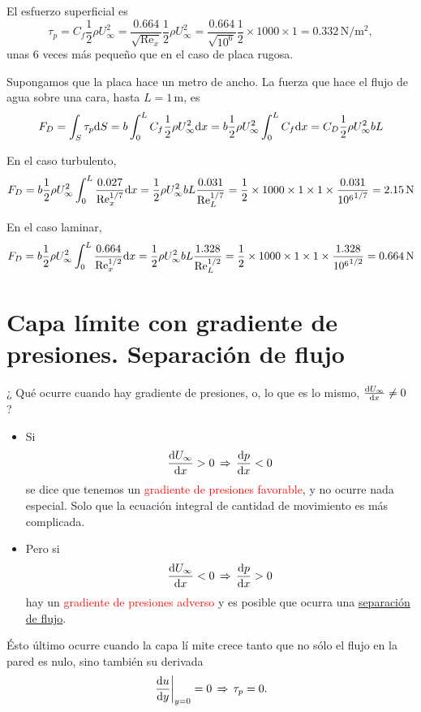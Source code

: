 		El esfuerzo superficial es {\small{}
			\[
			\tau_{p}=C_{f}\frac{1}{2}\rho U_{\infty}^{2}=\frac{0.664}{\sqrt{\text{Re}_{x}}}\frac{1}{2}\rho U_{\infty}^{2}=\frac{0.664}{\sqrt{10^{6}}}\frac{1}{2}\times1000\times1=0.332\,\text{N}/\text{m}^{2},
			\]
		} unas 6 veces más pequeño que en el caso de placa rugosa.

		Supongamos que la placa hace un metro de ancho. La fuerza que hace
		el flujo de agua sobre una cara, hasta $L=1\,\text{m}$, es 
			\[
			F_{D}=\int_{S}\tau_{p}\text{d} S=b\int_{0}^{L}C_{f}\frac{1}{2}\rho U_{\infty}^{2}\text{d} x=b\frac{1}{2}\rho U_{\infty}^{2}\int_{0}^{L}C_{f}\text{d} x=C_{D}\frac{1}{2}\rho U_{\infty}^{2}bL
			\]
		
		
		En el caso turbulento,
			\[
			F_{D}=b\frac{1}{2}\rho U_{\infty}^{2}\int_{0}^{L}\frac{0.027}{\text{Re}_{x}^{1/7}}\text{d} x=\frac{1}{2}\rho U_{\infty}^{2}bL\frac{0.031}{\text{Re}_{L}^{1/7}}=\frac{1}{2}\times1000\times1\times1\times\frac{0.031}{{10^{6}}^{1/7}}=2.15\,\text{N}
			\]
		
		
		En el caso laminar,
			\[
			F_{D}=b\frac{1}{2}\rho U_{\infty}^{2}\int_{0}^{L}\frac{0.664}{\text{Re}_{x}^{1/2}}\text{d} x=\frac{1}{2}\rho U_{\infty}^{2}bL\frac{1.328}{\text{Re}_{L}^{1/2}}=\frac{1}{2}\times1000\times1\times1\times\frac{1.328}{{10^{6}}^{1/2}}=0.664\,\text{N}
			\]
		

\section{Capa límite con gradiente de presiones. Separación de flujo}

	
	¿ Qué ocurre cuando hay gradiente de presiones, o, lo que es lo mismo,
	$\frac{\textrm{d} U_{\infty}}{\textrm{d} x}\neq0$ ?
	\begin{itemize}
		\item Si {\small{}
			\[
			\frac{\textrm{d} U_{\infty}}{\textrm{d} x}>0\,\Rightarrow\,\frac{\textrm{d} p}{\textrm{d} x}<0
			\]
		} se dice que tenemos un \textcolor{red}{gradiente de presiones favorable},
		y no ocurre nada especial. Solo que la ecuación integral de cantidad
		de movimiento es más complicada.
		\item Pero si {\small{}
			\[
			\frac{\textrm{d} U_{\infty}}{\textrm{d} x}<0\,\Rightarrow\,\frac{\textrm{d} p}{\textrm{d} x}>0
			\]
		} hay un \textcolor{red}{gradiente de presiones adverso} y es posible
		que ocurra una \textcolor{red}{\href{https://en.wikipedia.org/wiki/Flow_separation}{separación de flujo}}.
	\end{itemize}
	Ésto último ocurre cuando la capa lí mite crece tanto que no sólo
	el flujo en la pared es nulo, sino también su derivada {\small{}
		\[
		\left.\frac{\textrm{d} u}{\textrm{d} y}\right|_{y=0}=0\,\Rightarrow\,\tau_{p}=0.
		\]
	}{\small\par}

